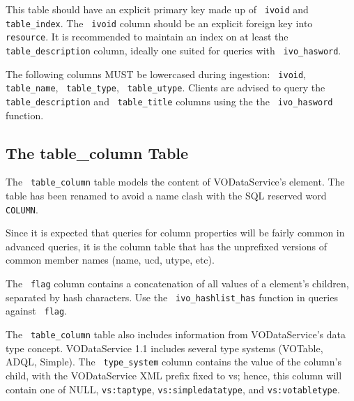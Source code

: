 \documentclass[11pt,a4paper]{ivoa}
\newcommand{\rtent}[1]{\texttt{\color{rtcolor} #1}}
\begin{document}
This table should have an explicit primary key made up of
\rtent{ivoid} and \rtent{table\_index}.  The 
\rtent{ivoid} column should be an explicit
foreign key into \rtent{resource}.  It is recommended to
maintain an index on at least the \rtent{table\_description}
column, ideally one suited for queries with \rtent{ivo\_hasword}.

The following columns MUST be lowercased during ingestion:
\rtent{ivoid}, \rtent{table\_name}, \rtent{table\_type},
\rtent{table\_utype}.
Clients are advised to query the \rtent{table\_description}
and \rtent{table\_title}  columns
using the the \rtent{ivo\_hasword} function.



\subsection{The table\_column Table}

\label{table_table_column}

The \rtent{table\_column}  table models the content of VODataService's
 element.  The table has been renamed to avoid
a name clash with the SQL reserved word \texttt{COLUMN}.

Since it is expected that queries for column properties will be
fairly common in advanced queries, it is the column table that has the
unprefixed versions of common member names (name,  ucd,
utype, etc).

The \rtent{flag} column contains a concatenation of all values
of a  element's  children, separated
by hash characters.  Use the \rtent{ivo\_hashlist\_has} function in
queries against \rtent{flag}.

The \rtent{table\_column} table also includes information from
VODataService's data type concept.  VODataService 1.1 includes several type
systems (VOTable, ADQL, Simple).  The
\rtent{type\_system} column contains the value of the column's 
 child, with the VODataService XML prefix fixed
to vs; hence, this column will contain one of NULL,
\texttt{vs:taptype},
\texttt{vs:simpledatatype}, and \texttt{vs:votabletype}.


\end{document}
